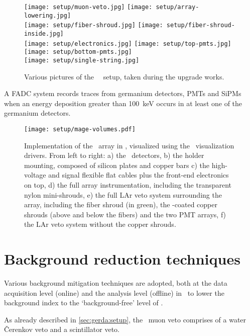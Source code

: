 \begin{figure}
  \texttt{[image: setup/muon-veto.jpg]}%
  \texttt{[image: setup/array-lowering.jpg]}\\
  \texttt{[image: setup/fiber-shroud.jpg]}%
  \texttt{[image: setup/fiber-shroud-inside.jpg]}\\
  \texttt{[image: setup/electronics.jpg]}%
  \texttt{[image: setup/top-pmts.jpg]}%
  \texttt{[image: setup/bottom-pmts.jpg]}\\
  \texttt{[image: setup/single-string.jpg]}
  \caption{%
    Various pictures of the \gerda\ \phasetwo\ setup, taken during the upgrade
    works.
  }\label{fig:setup:pictures}
\end{figure}

A FADC system records traces from germanium detectors, PMTs and SiPMs when an energy
deposition greater than 100~keV occurs in at least one of the germanium detectors.

\begin{figure}
  \centering
  \texttt{[image: setup/mage-volumes.pdf]}
  \caption{%
    Implementation of the \gerda\ array in \mage, visualized using the
    \geant\ visualization drivers. From left to right: a) the \gerda\
    detectors, b) the holder mounting, composed of silicon plates and
    copper bars c) the high-voltage and signal flexible flat cables plus
    the front-end electronics on top, d) the full array instrumentation,
    including the transparent nylon mini-shrouds, e) the full LAr veto
    system surrounding the array, including the fiber shroud (in green),
    the \tetratex-coated copper shrouds (above and below the fibers) and
    the two PMT arrays, f) the LAr veto system without the copper
    shrouds.%
  }\label{fig:setup:magevolumes}
\end{figure}

\section{Background reduction techniques}\label{sec:gerda:cuts}

Various background mitigation techniques are adopted, both at the data acquisition level
(online) and the analysis level (offline) in \gerda\ to lower the background index to the
`background-free' level of \pIIbi.

As already described in \cref{sec:gerda:setup}, the \gerda\ muon veto comprises of a water
\v{C}erenkov veto and a scintillator veto.

